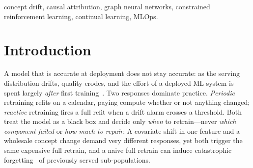 \documentclass[conference]{IEEEtran}
\begin{document}
\begin{abstract}
Deployed machine-learning models degrade as data distributions drift, yet the
dominant maintenance policies---periodic and drift-triggered full
retraining---answer only \emph{when} to retrain, never \emph{which} part of the
model failed or \emph{how much} of it to repair. We present CADENCE, a
closed-loop framework that (i) builds a drift-attribution graph over external
input features \emph{and} internal activation clusters, (ii) scores per-node
responsibility with a graph neural network and predicts each repair's benefit
with a counterfactual surrogate, and (iii) selects a minimal, cost- and
SLA-constrained retraining scope. Under a pre-registered protocol in which we
report negative results as first-class findings, the learned attribution beats
a Population-Stability-Index baseline on contested synthetic drift (mean
reciprocal rank $0.10{\to}0.41$, AUROC $0.67{\to}0.91$; $p<0.001$, $n{=}10$);
targeted partial retraining cuts Split-MNIST forgetting from $39.5\%$ to near
zero against a fair replay baseline ($p<0.001$, $n{=}10$); and on real
electricity-market drift the policy saves $69.1\%$ of retraining compute for a
$1.66$-point F1 cost. We further show, honestly, that the framework is
net-positive only above a measured retrain-cost break-even, that graph
construction scales as $\approx O(n^{2.6})$, and that a learned policy is
competitive-but-not-superior to a greedy rule at a three-action scale---defining
the operating envelope of diagnosis-driven model repair.
\end{abstract}

\begin{IEEEkeywords}
concept drift, causal attribution, graph neural networks, constrained
reinforcement learning, continual learning, MLOps.
\end{IEEEkeywords}

\section{Introduction}
A model that is accurate at deployment does not stay accurate: as the serving
distribution drifts, quality erodes, and the effort of a deployed ML system is
spent largely \emph{after} first training~\cite{sculley2015,paleyes2022}. Two
responses dominate practice. \emph{Periodic} retraining refits on a calendar,
paying compute whether or not anything changed; \emph{reactive} retraining fires
a full refit when a drift alarm crosses a threshold. Both treat the model as a
black box and decide only \emph{when} to retrain---never \emph{which component
failed} or \emph{how much to repair}. A covariate shift in one feature and a
wholesale concept change demand very different responses, yet both trigger the
same expensive full retrain, and a naive full retrain can induce catastrophic
forgetting~\cite{mccloskey1989} of previously served sub-populations.
\end{document}
